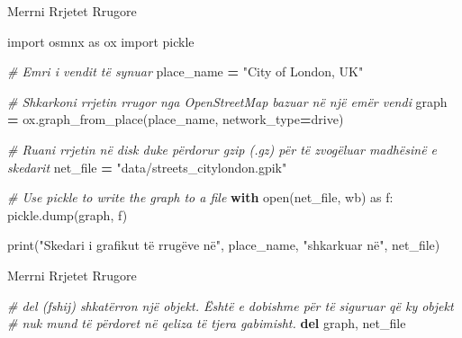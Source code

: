 \documentclass[
  ignorenonframetext,
]{beamer}
\newenvironment{Shaded}{\begin{snugshade}}{\end{snugshade}}
\newcommand{\BuiltInTok}[1]{#1}
\newcommand{\CommentTok}[1]{\textcolor[rgb]{0.56,0.35,0.01}{\textit{#1}}}
\newcommand{\ControlFlowTok}[1]{\textcolor[rgb]{0.13,0.29,0.53}{\textbf{#1}}}
\newcommand{\ImportTok}[1]{#1}
\newcommand{\KeywordTok}[1]{\textcolor[rgb]{0.13,0.29,0.53}{\textbf{#1}}}
\newcommand{\NormalTok}[1]{#1}
\newcommand{\OperatorTok}[1]{\textcolor[rgb]{0.81,0.36,0.00}{\textbf{#1}}}
\newcommand{\StringTok}[1]{\textcolor[rgb]{0.31,0.60,0.02}{#1}}
\begin{document}
\begin{frame}[fragile]{Merrni Rrjetet Rrugore}
\protect\hypertarget{merrni-rrjetet-rrugore}{}

\begin{Shaded}
\begin{Highlighting}[]
\ImportTok{import}\NormalTok{ osmnx }\ImportTok{as}\NormalTok{ ox}
\ImportTok{import}\NormalTok{ pickle}

\CommentTok{\# Emri i vendit të synuar}
\NormalTok{place\_name }\OperatorTok{=} \StringTok{"City of London, UK"}

\CommentTok{\# Shkarkoni rrjetin rrugor nga OpenStreetMap bazuar në një emër vendi}
\NormalTok{graph }\OperatorTok{=}\NormalTok{ ox.graph\_from\_place(place\_name, network\_type}\OperatorTok{=}\StringTok{\textquotesingle{}drive\textquotesingle{}}\NormalTok{)}

\CommentTok{\# Ruani rrjetin në disk duke përdorur gzip (.gz) për të zvogëluar madhësinë e skedarit}
\NormalTok{net\_file }\OperatorTok{=} \StringTok{"data/streets\_citylondon.gpik"}

\CommentTok{\# Use pickle to write the graph to a file}
\ControlFlowTok{with} \BuiltInTok{open}\NormalTok{(net\_file, }\StringTok{\textquotesingle{}wb\textquotesingle{}}\NormalTok{) }\ImportTok{as}\NormalTok{ f:}
\NormalTok{    pickle.dump(graph, f)}

\BuiltInTok{print}\NormalTok{(}\StringTok{"Skedari i grafikut të rrugëve në"}\NormalTok{, place\_name, }\StringTok{"shkarkuar në"}\NormalTok{, net\_file)}
\end{Highlighting}
\end{Shaded}
\end{frame}

\begin{frame}[fragile]{Merrni Rrjetet Rrugore}
\protect\hypertarget{merrni-rrjetet-rrugore-1}{}

\begin{Shaded}
\begin{Highlighting}[]
\CommentTok{\# \textquotesingle{}del\textquotesingle{} (fshij) shkatërron një objekt. Është e dobishme për të siguruar që ky objekt}
\CommentTok{\# nuk mund të përdoret në qeliza të tjera gabimisht.}
\KeywordTok{del}\NormalTok{ graph, net\_file}
\end{Highlighting}
\end{Shaded}
\end{frame}
\end{document}
